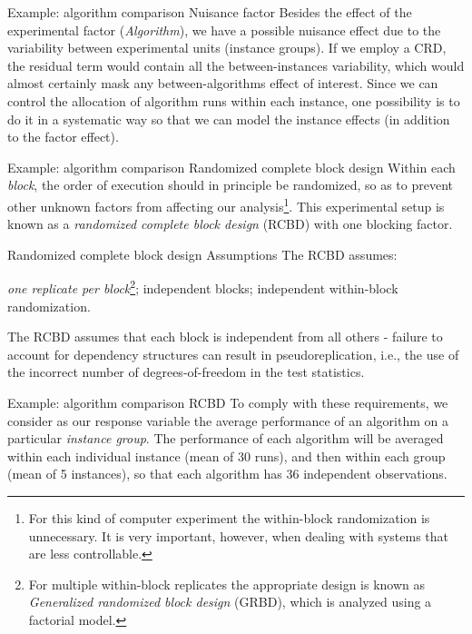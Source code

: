\documentclass[t]{beamer}
\begin{document}

\begin{ftst}
{Example: algorithm comparison}
{Nuisance factor}
Besides the effect of the experimental factor (\textit{Algorithm}), we have a possible nuisance effect due to the variability between experimental units (instance groups).
\vone
If we employ a CRD, the residual term would contain all the between-instances variability, which would almost certainly mask any between-algorithms effect of interest.
\vone
Since we can control the allocation of algorithm runs within each instance, one possibility is to do it in a systematic way so that we can model the instance effects (in addition to the factor effect).
\end{ftst}


\begin{ftst}
{Example: algorithm comparison}
{Randomized complete block design}
Within each \textit{block}, the order of execution should in principle be randomized, so as to prevent other unknown factors from affecting our analysis\footnote[2]{\tiny For this kind of computer experiment the within-block randomization is unnecessary. It is very important, however, when dealing with systems that are less controllable.}. 
\vone
This experimental setup is known as a \textit{randomized complete block design} (RCBD) with one blocking factor.
\end{ftst}


\begin{ftst}
{Randomized complete block design}
{Assumptions}
The RCBD assumes:

\bitems \textit{one replicate per block}\footnote[3]{\tiny For multiple within-block replicates the appropriate design is known as \textit{Generalized randomized block design} (GRBD), which is analyzed using a factorial model.};
\spitem independent blocks;
\spitem independent within-block randomization. 
\eitem

The RCBD assumes that each block is independent from all others - failure to account for dependency structures can result in pseudoreplication, i.e., the use of the incorrect number of degrees-of-freedom in the test statistics.
\end{ftst}


\begin{ftst}
{Example: algorithm comparison}
{RCBD}
To comply with these requirements, we consider as our response variable the average performance of an algorithm on a particular \textit{instance group}.
\vone
The performance of each algorithm will be averaged within each individual instance (mean of 30 runs), and then within each group (mean of 5 instances), so that each algorithm has 36 independent observations.
\end{ftst}
\end{document}
